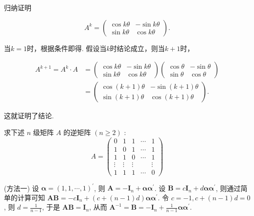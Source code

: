 \begin{solution}
    归纳证明

$$A^k=\begin{pmatrix}\cos k\theta&-\sin k\theta\\\sin k\theta&\cos k\theta\end{pmatrix}.$$

当$k=1$时，根据条件即得. 假设当$k$时结论成立，则当$k+1$时，

$$\begin{aligned}A^{k+1}=A^k\cdot A&=\begin{pmatrix}\cos k\theta&-\sin k\theta\\\sin k\theta&\cos k\theta\end{pmatrix}\begin{pmatrix}\cos\theta&-\sin\theta\\\sin\theta&\cos\theta\end{pmatrix}\\&=\begin{pmatrix}\cos(k+1)\theta&-\sin(k+1)\theta\\\sin(k+1)\theta&\cos(k+1)\theta\end{pmatrix}.\end{aligned}$$

这就证明了结论.
\end{solution}

\begin{problem}
    求下述 $n$ 级矩阵 $A$ 的逆矩阵 $(n \geqslant 2)$ :
\[
A=\left(\begin{array}{ccccc}
0 & 1 & 1 & \cdots & 1 \\
1 & 0 & 1 & \cdots & 1 \\
1 & 1 & 0 & \cdots & 1 \\
\vdots & \vdots & \vdots & & \vdots \\
1 & 1 & 1 & \cdots & 0
\end{array}\right)
\]
\end{problem}

\begin{solution}{(方法一)}
    设 $\boldsymbol{\alpha}=(1,1, \cdots, 1)^{\prime}$, 则 $\boldsymbol{A}=-\boldsymbol{I}_n+\boldsymbol{\alpha} \boldsymbol{\alpha}^{\prime}$. 设 $\boldsymbol{B}=c \boldsymbol{I}_n+d \boldsymbol{\alpha} \boldsymbol{\alpha}^{\prime}$, 则通过简单的计算可知 $\boldsymbol{A B}=-c \boldsymbol{I}_n+(c+(n-1) d) \boldsymbol{\alpha} \boldsymbol{\alpha}^{\prime}$. 令 $c=-1, c+(n-1) d=0$, 则 $d=\frac{1}{n-1}$, 于是 $\boldsymbol{A B}=\boldsymbol{I}_n$, 从而 $\boldsymbol{A}^{-1}=\boldsymbol{B}=-\boldsymbol{I}_n+\frac{1}{n-1} \boldsymbol{\alpha} \boldsymbol{\alpha}^{\prime}$.
\end{solution}

